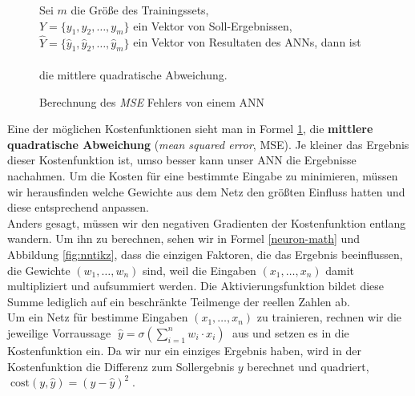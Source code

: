                 \begin{figure}[H]
                    \begin{mdframed}
                        \noindent
                        Sei $m$ die Größe des Trainingssets,\\
                        \hspace*{4.5mm} $Y = \{y_1, y_2,\dotsc,y_m\}$ ein Vektor von Soll-Ergebnissen, \\
                        \hspace*{4.5mm} $\widehat{Y} = \{\widehat{y}_1, \widehat{y}_2,\dotsc,\widehat{y}_m\}$ ein Vektor von Resultaten des ANNs, dann ist\\[4mm]
                        \hspace*{30mm} \\[4mm]
                        die mittlere quadratische Abweichung.
                    \end{mdframed}
                    \formforfigure
                    \caption{\label{cost-math}Berechnung des \textit{MSE} Fehlers von einem ANN}
                \end{figure}
                \noindent
                Eine der möglichen Kostenfunktionen sieht man in Formel \ref{cost-math}, die \textbf{mittlere quadratische Abweichung} (\textit{mean squared error}, MSE). Je kleiner das Ergebnis dieser Kostenfunktion ist, umso besser kann unser ANN die Ergebnisse nachahmen. Um die Kosten für eine bestimmte Eingabe zu minimieren, müssen wir herausfinden welche Gewichte aus dem Netz den größten Einfluss hatten und diese entsprechend anpassen. \\

                \noindent
                Anders gesagt, müssen wir den negativen Gradienten der Kostenfunktion entlang wandern. Um ihn zu berechnen, sehen wir in Formel \ref{neuron-math} und Abbildung \ref{fig:nntikz}, dass die einzigen Faktoren, die das Ergebnis beeinflussen, die Gewichte $(w_1, \dotsc , w_n)$ sind, weil die Eingaben $(x_1, \dotsc , x_n)$ damit multipliziert und aufsummiert werden. Die Aktivierungsfunktion bildet diese Summe lediglich auf ein beschränkte Teilmenge der reellen Zahlen ab. \\

                \noindent
                Um ein Netz für bestimme Eingaben $(x_1, \dotsc , x_n)$ zu trainieren, rechnen wir die jeweilige Vorraussage $\; \widehat{y} = \sigma(\sum^{n}_{i = 1} w_i \cdot x_i) \;$ aus und setzen es in die Kostenfunktion ein. Da wir nur ein einziges Ergebnis haben, wird in der Kostenfunktion die Differenz zum Sollergebnis $y$ berechnet und quadriert, $\; \text{cost}(y, \widehat{y}) = (y - \widehat{y})^2 \;$. \\

